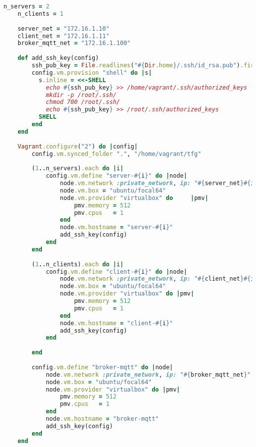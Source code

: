\begin{lstlisting}[language=Ruby, caption={Archivo de configuración Vagrantfile}, label={code:vagrantfile}]
    n_servers = 2
    n_clients = 1
    
    server_net = "172.16.1.10"
    client_net = "172.16.1.11"
    broker_mqtt_net = "172.16.1.100"
    
    def add_ssh_key(config)
        ssh_pub_key = File.readlines("#{Dir.home}/.ssh/id_rsa.pub").first.strip
        config.vm.provision "shell" do |s|
          s.inline = <<-SHELL
            echo #{ssh_pub_key} >> /home/vagrant/.ssh/authorized_keys
            mkdir -p /root/.ssh/
            chmod 700 /root/.ssh/
            echo #{ssh_pub_key} >> /root/.ssh/authorized_keys
          SHELL
        end
    end
    
    Vagrant.configure("2") do |config|
        config.vm.synced_folder ".", "/home/vagrant/tfg"
    
        (1..n_servers).each do |i|
            config.vm.define "server-#{i}" do |node|
                node.vm.network :private_network, ip: "#{server_net}#{i}"
                node.vm.box = "ubuntu/focal64"
                node.vm.provider "virtualbox" do     |pmv|
                    pmv.memory = 512
                    pmv.cpus   = 1
                end
                node.vm.hostname = "server-#{i}"
                add_ssh_key(config)
            end
        end
    
        (1..n_clients).each do |i|
            config.vm.define "client-#{i}" do |node|
                node.vm.network :private_network, ip: "#{client_net}#{i}"
                node.vm.box = "ubuntu/focal64"
                node.vm.provider "virtualbox" do |pmv|
                    pmv.memory = 512
                    pmv.cpus   = 1
                end
                node.vm.hostname = "client-#{i}"
                add_ssh_key(config)
            end
            
        end
    
        config.vm.define "broker-mqtt" do |node|
            node.vm.network :private_network, ip: "#{broker_mqtt_net}"
            node.vm.box = "ubuntu/focal64"
            node.vm.provider "virtualbox" do |pmv|
                pmv.memory = 512
                pmv.cpus   = 1
            end
            node.vm.hostname = "broker-mqtt"
            add_ssh_key(config)
        end
    end        
\end{lstlisting}
